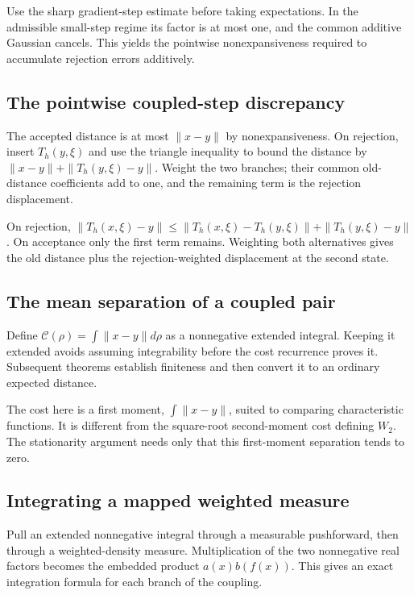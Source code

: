 \documentclass[11pt,a4paper]{article}
\begin{document}
Use the sharp gradient-step estimate before taking expectations. In the admissible small-step regime its factor is at most one, and the common additive Gaussian cancels. This yields the pointwise nonexpansiveness required to accumulate rejection errors additively.


\subsection{\texorpdfstring{The pointwise coupled-step discrepancy}{The pointwise coupled-step discrepancy}}


The accepted distance is at most \(\|x-y\|\) by nonexpansiveness. On rejection, insert \(T_h(y,\xi)\) and use the triangle inequality to bound the distance by \(\|x-y\|+\|T_h(y,\xi)-y\|\). Weight the two branches; their common old-distance coefficients add to one, and the remaining term is the rejection displacement.



On rejection, \(\|T_h(x,\xi)-y\|\le\|T_h(x,\xi)-T_h(y,\xi)\|+\|T_h(y,\xi)-y\|\). On acceptance only the first term remains. Weighting both alternatives gives the old distance plus the rejection-weighted displacement at the second state.


\subsection{\texorpdfstring{The mean separation of a coupled pair}{The mean separation of a coupled pair}}


Define \(\mathcal C(\rho)=\int\|x-y\|d\rho\) as a nonnegative extended integral. Keeping it extended avoids assuming integrability before the cost recurrence proves it. Subsequent theorems establish finiteness and then convert it to an ordinary expected distance.



The cost here is a first moment, \(\int\|x-y\|\), suited to comparing characteristic functions. It is different from the square-root second-moment cost defining \(W_2\). The stationarity argument needs only that this first-moment separation tends to zero.


\subsection{\texorpdfstring{Integrating a mapped weighted measure}{Integrating a mapped weighted measure}}


Pull an extended nonnegative integral through a measurable pushforward, then through a weighted-density measure. Multiplication of the two nonnegative real factors becomes the embedded product \(a(x)b(f(x))\). This gives an exact integration formula for each branch of the coupling.
\end{document}
